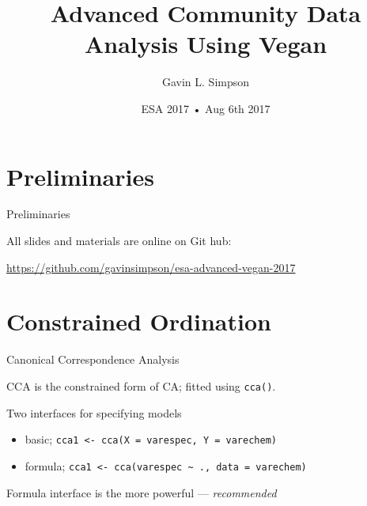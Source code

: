 \documentclass[10pt,ignorenonframetext,compress, aspectratio=169]{beamer}
\title{Advanced Community Data Analysis Using Vegan}
\author{Gavin L. Simpson}
\date{ESA 2017 • Aug 6th 2017}
\providecommand{\tightlist}{%
  \setlength{\itemsep}{0pt}\setlength{\parskip}{0pt}}
\begin{document}
\frame{\titlepage}

\section{Preliminaries}\label{preliminaries}

\begin{frame}{Preliminaries}

All slides and materials are online on Git hub:

\href{}{https://github.com/gavinsimpson/esa-advanced-vegan-2017}

\end{frame}

\section{Constrained Ordination}\label{constrained-ordination}

\begin{frame}[fragile]{Canonical Correspondence Analysis}

CCA is the constrained form of CA; fitted using \texttt{cca()}.

Two interfaces for specifying models

\begin{itemize}
\tightlist
\item
  basic;
  \texttt{cca1\ \textless{}-\ cca(X\ =\ varespec,\ Y\ =\ varechem)}
\item
  formula;
  \texttt{cca1\ \textless{}-\ cca(varespec\ \textasciitilde{}\ .,\ data\ =\ varechem)}
\end{itemize}

Formula interface is the more powerful --- \emph{recommended}

\end{frame}
\end{document}
